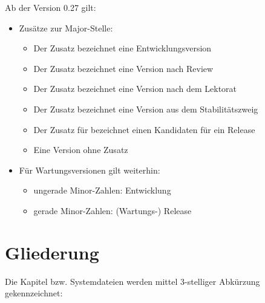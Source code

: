 \documentclass[
ngerman,
paper=a4,
asymmetric,
fontsize=10pt,
draft=false,
numbers=noenddot,
bibtotocnumbered,
footnotes=multiple,
toc=flat,
]{scrbook}
\begin{document}
\Text
{Ab der Version 0.27 gilt:}
{\begin{itemize}
  \item Zusätze zur Major-Stelle:\begin{itemize}
  \item Der Zusatz  bezeichnet eine
  Entwicklungsversion
  \item Der Zusatz  bezeichnet eine
  Version nach Review
  \item Der Zusatz  bezeichnet eine
  Version nach dem Lektorat
  \item Der Zusatz  bezeichnet eine
  Version aus dem Stabilitätszweig
  \item Der Zusatz  für  bezeichnet einen Kandidaten für ein Release
  \item Eine Version ohne Zusatz
\end{itemize}
\item Für Wartungsversionen gilt weiterhin: 
\begin{itemize}
  \item ungerade Minor-Zahlen: Entwicklung
  \item gerade Minor-Zahlen: (Wartungs-) Release
\end{itemize}
\end{itemize}}
{}
{}
{}
{}




\section{Gliederung}
Die Kapitel bzw. Systemdateien werden mittel 3-stelliger
Abkürzung gekennzeichnet:
\end{document}
